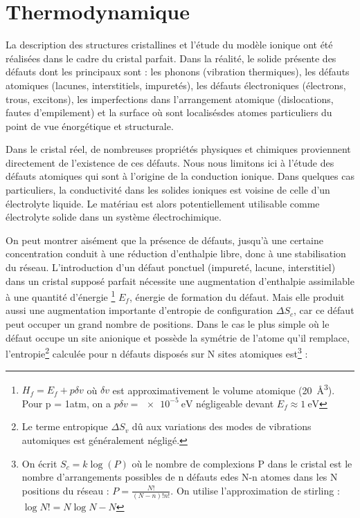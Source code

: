 \chapter{Thermodynamique}

La description des structures cristallines et l'étude du modèle ionique ont été
réalisées dans le cadre du cristal parfait. Dans la réalité, le solide présente
des défauts dont les principaux sont : les phonons (vibration thermiques), les
défauts atomiques (lacunes, interstitiels, impuretés), les défauts électroniques
(électrons, trous, excitons), les imperfections dans l'arrangement atomique
(dislocations, fautes d'empilement) et la surface où sont localisésdes atomes
particuliers du point de vue énorgétique et structurale.

Dans le cristal réel, de nombreuses propriétés physiques et chimiques proviennent
directement de l'existence de ces défauts. Nous nous limitons ici à l'étude des
défauts atomiques qui sont à l'origine de la conduction ionique. Dans quelques
cas particuliers, la conductivité dans les solides ioniques est voisine de celle
d'un électrolyte liquide. Le matériau est alors potentiellement utilisable comme
électrolyte solide dans un système électrochimique.

On peut montrer aisément que la présence de défauts, jusqu'à une certaine
concentration conduit à une réduction d'enthalpie libre, donc à une stabilisation
du réseau. L'introduction d'un défaut ponctuel (impureté, lacune, interstitiel)
dans un cristal supposé parfait nécessite une augmentation d'enthalpie
assimilable à une quantité d'énergie
\footnote{$H_f = E_f + p\delta v$ où $\delta v$ est approximativement le volume
    atomique (\SI{20}{\cubic\angstrom}). Pour p = 1atm, on a
    $p \delta v = \SI{e-5}{\electronvolt}$ négligeable devant
$E_f \approx \SI{1}{\electronvolt}$ }
$E_f$, énergie de formation du défaut. Mais elle produit aussi une augmentation
importante d'entropie de configuration $\Delta S_c$, car ce défaut peut occuper
un grand nombre de positions. Dans le cas le plus simple où le défaut occupe un
site anionique et possède la symétrie de l'atome qu'il remplace,
l'entropie\footnote{Le terme entropique $\Delta S_v$ dû aux variations des modes
de vibrations automiques est généralement négligé.} calculée pour n défauts
disposés sur N sites atomiques est\footnote{On écrit $S_c = k \log(P)$ où le
nombre de complexions P dans le cristal est le nombre d'arrangements possibles de
n défauts edes N-n atomes dans les N positions du réseau : $P =
\frac{N!}{(N-n)!n!}$. On utilise l'approximation de stirling : $\log N! = N \log
N - N$} :

